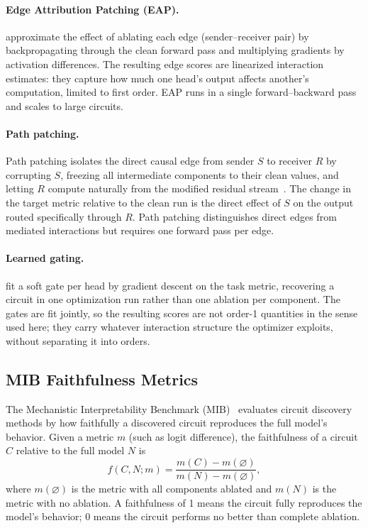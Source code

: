 \documentclass{article}
\begin{document}
\paragraph{Edge Attribution Patching (EAP).}

\citet{syed2023attribution} approximate the effect of ablating each
edge (sender--receiver pair) by backpropagating through the clean
forward pass and multiplying gradients by activation differences. The
resulting edge scores are linearized interaction estimates: they
capture how much one head's output affects another's computation,
limited to first order. EAP runs in a single forward--backward pass and
scales to large circuits.

\paragraph{Path patching.}

Path patching isolates the direct causal edge from sender $S$ to
receiver $R$ by corrupting $S$, freezing all intermediate components to
their clean values, and letting $R$ compute naturally from the modified
residual stream~\citep{wang2022ioi}. The change in the target metric
relative to the clean run is the direct effect of $S$ on the output
routed specifically through $R$. Path patching distinguishes direct
edges from mediated interactions but requires one forward pass per edge.

\paragraph{Learned gating.}

\citet{chen2025causalheadgating} fit a soft gate per head by gradient
descent on the task metric, recovering a circuit in one optimization run
rather than one ablation per component. The gates are fit jointly, so the
resulting scores are not order-1 quantities in the sense used here; they
carry whatever interaction structure the optimizer exploits, without
separating it into orders.

\subsection{MIB Faithfulness Metrics}
\label{sec:mib-metrics}

The Mechanistic Interpretability Benchmark
(MIB)~\citep{mueller2025mib} evaluates circuit discovery methods by how
faithfully a discovered circuit reproduces the full model's behavior.
Given a metric $m$ (such as logit difference), the faithfulness of a
circuit $C$ relative to the full model $N$ is
\begin{equation}
  f(C, N; m) = \frac{m(C) - m(\varnothing)}{m(N) - m(\varnothing)},
  \label{eq:faithfulness}
\end{equation}
where $m(\varnothing)$ is the metric with all components ablated and
$m(N)$ is the metric with no ablation. A faithfulness of 1 means the
circuit fully reproduces the model's behavior; 0 means the circuit
performs no better than complete ablation.
\end{document}
